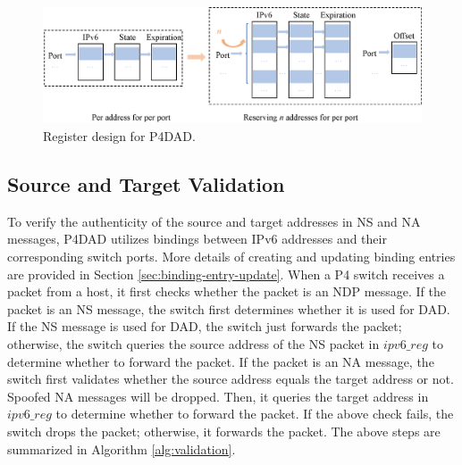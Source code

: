 \documentclass[a4paper,fleqn]{cas-dc}
\begin{document}
        \begin{figure}
        \centerline{
            \includegraphics[scale=0.65]{figure/Register.eps}
        }
        \caption{Register design for P4DAD.}
        \label{fig:register}
        \end{figure}


    \subsection{Source and Target Validation}\label{sec:source and target validation}
        To verify the authenticity of the source and target addresses in NS and NA messages, P4DAD utilizes bindings between IPv6 addresses and their corresponding switch ports. More details of creating and updating binding entries are provided in Section \ref{sec:binding-entry-update}. When a P4 switch receives a packet from a host, it first checks whether the packet is an NDP message. If the packet is an NS message, the switch first determines whether it is used for DAD. If the NS message is used for DAD, the switch just forwards the packet; otherwise, the switch queries the source address of the NS packet in $ipv6\_reg$ to determine whether to forward the packet.
        If the packet is an NA message, the switch first validates whether the source address equals the target address or not. Spoofed NA messages will be dropped. Then, it queries the target address in $ipv6\_reg$ to determine whether to forward the packet. If the above check fails, the switch drops the packet; otherwise, it forwards the packet.
        The above steps are summarized in Algorithm \ref{alg:validation}.
\end{document}
